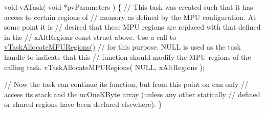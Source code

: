\begin{DoxyPre}void vATask( void *pvParameters )
\{
    // This task was created such that it has access to certain regions of
    // memory as defined by the MPU configuration.  At some point it is
    // desired that these MPU regions are replaced with that defined in the
    // xAltRegions const struct above.  Use a call to \hyperlink{externals_2freertos_2include_2task_8h_ad889595baff9faf9efe02f3696825409}{vTaskAllocateMPURegions()}
    // for this purpose.  NULL is used as the task handle to indicate that this
    // function should modify the MPU regions of the calling task.
    vTaskAllocateMPURegions( NULL, xAltRegions );\end{DoxyPre}



\begin{DoxyPre}    // Now the task can continue its function, but from this point on can only
    // access its stack and the ucOneKByte array (unless any other statically
    // defined or shared regions have been declared elsewhere).
\}
   \end{DoxyPre}
 